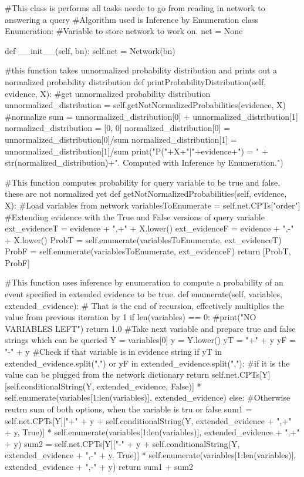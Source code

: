 \documentclass[10pt]{article}
\begin{document}
\begin{spverbatim}
#This class is performs all tasks neede to go from reading in network to answering a query
#Algorithm used is Inference by Enumeration
class Enumeration:
    #Variable to store network to work on.
    net = None
    
    def __init__(self,  bn):
        self.net = Network(bn)
        
    #this function takes unnormalized probability distribution and prints out a normalized probability distribution    
    def printProbabilityDistribution(self, evidence, X):
        #get unnormalized probability distribution
        unnormalized_distribution = self.getNotNormalizedProbabilities(evidence,  X)
        #normalize
        sum = unnormalized_distribution[0] + unnormalized_distribution[1]
        normalized_distribution = [0, 0]
        normalized_distribution[0] = unnormalized_distribution[0]/sum
        normalized_distribution[1] = unnormalized_distribution[1]/sum
        print("P("+X+"|"+evidence+") = " + str(normalized_distribution)+". Computed with Inference by Enumeration.")
    
    #This function computes probability for query variable to be true and false, these are not normalized yet
    def getNotNormalizedProbabilities(self,  evidence,  X):
        #Load variables from network
        variablesToEnumerate = self.net.CPTs["order"]
        #Extending evidence with the True and False versions of query variable
        ext_evidenceT = evidence + ",+" + X.lower()
        ext_evidenceF = evidence + ",-" + X.lower()
        ProbT = self.enumerate(variablesToEnumerate, ext_evidenceT)
        ProbF = self.enumerate(variablesToEnumerate, ext_evidenceF)
        return [ProbT,  ProbF]
    
    #This function uses inference by enumeration to compute a probability of an event specified in extended evidence to be true.
    def enumerate(self, variables,  extended_evidence):
        # That is the end of recursion, effectively multiplies the value from previous iteration by 1
        if len(variables) == 0:
            #print("NO VARIABLES LEFT")
            return 1.0
        #Take next variable and prepare true and false strings which can be queried
        Y = variables[0]
        y = Y.lower()
        yT = "+" + y
        yF = "-" + y
        #Check if that variable is in evidence string
        if yT in extended_evidence.split(",") or yF in extended_evidence.split(","):
            #if it is the value can be plugged from the network dictionary
            return self.net.CPTs[Y][self.conditionalString(Y, extended_evidence,  False)] * self.enumerate(variables[1:len(variables)], extended_evidence)
        else:
            #Otherwise reutrn sum of both options, when the variable is tru or false
            sum1 = self.net.CPTs[Y]["+" + y + self.conditionalString(Y, extended_evidence + ",+" + y,  True)] * self.enumerate(variables[1:len(variables)], extended_evidence + ",+" + y)
            sum2 = self.net.CPTs[Y]["-" + y + self.conditionalString(Y, extended_evidence + ",-" + y,  True)] * self.enumerate(variables[1:len(variables)], extended_evidence + ",-" + y)
            return sum1 + sum2
    

\end{spverbatim}
\end{document}
